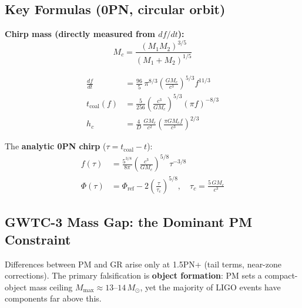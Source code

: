 \documentclass[10pt,twocolumn]{article}
\begin{document}
\subsection*{Key Formulas (0PN, circular orbit)}

\noindent\textbf{Chirp mass (directly measured from $df/dt$):}
\[
  \boxed{M_c = \frac{(M_1 M_2)^{3/5}}{(M_1+M_2)^{1/5}}}
\]

\begin{align*}
  \frac{df}{dt} &= \frac{96}{5}\,\pi^{8/3}
      \left(\frac{G M_c}{c^3}\right)^{5/3} f^{11/3} \\[4pt]
  t_\mathrm{coal}(f) &= \frac{5}{256}
      \left(\frac{c^3}{G M_c}\right)^{5/3}
      (\pi f)^{-8/3} \\[4pt]
  h_c &= \frac{4}{D}\,\frac{G M_c}{c^2}
      \left(\frac{\pi G M_c f}{c^3}\right)^{2/3}
\end{align*}

\noindent The \textbf{analytic 0PN chirp} ($\tau = t_\mathrm{coal}-t$):
\begin{align}
  f(\tau) &= \frac{5^{3/8}}{8\pi}
      \left(\frac{c^3}{G M_c}\right)^{5/8} \tau^{-3/8} \\[4pt]
  \Phi(\tau) &= \Phi_\mathrm{ref} - 2\!\left(\frac{\tau}{\tau_c}\right)^{5/8},
      \quad \tau_c = \frac{5\,G M_c}{c^3}
\end{align}

\subsection*{GWTC-3 Mass Gap: the Dominant PM Constraint}

Differences between PM and GR arise only at 1.5PN+ (tail terms, near-zone
corrections).  The primary falsification is \textbf{object formation}: PM sets a
compact-object mass ceiling $M_\mathrm{max} \approx 13$--$14\,M_\odot$, yet the
majority of LIGO events have components far above this.

\begin{center}
\end{center}
\end{document}
